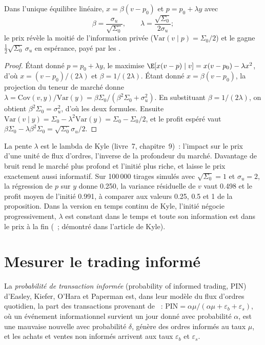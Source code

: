 \begin{proposition}\label{prop:mx:why-there-is-a-spread:kyle}
Dans l'unique équilibre linéaire, $x=\beta(v-p_0)$ et $p=p_0+\lambda y$ avec
\[
\beta=\frac{\sigma_u}{\sqrt{\Sigma_0}},\qquad \lambda=\frac{\sqrt{\Sigma_0}}{2\sigma_u};
\]
le prix révèle la moitié de l'information privée ($\mathrm{Var}(v\mid p)=\Sigma_0/2$) et le  gagne
$\tfrac12\sqrt{\Sigma_0}\,\sigma_u$ en espérance, payé par les .
\end{proposition}

\begin{proof}
Étant donné $p=p_0+\lambda y$, le  maximise $\E[x(v-p)\mid v]=x(v-p_0)-\lambda x^2$, d'où $x=(v-p_0)/(2\lambda)$ et $\beta=1/(2\lambda)$. Étant donné
$x=\beta(v-p_0)$, la projection du teneur de marché donne $\lambda=\mathrm{Cov}(v,y)/\mathrm{Var}(y)=\beta\Sigma_0/(\beta^2\Sigma_0+\sigma_u^2)$. En substituant
$\beta=1/(2\lambda)$, on obtient $\beta^2\Sigma_0=\sigma_u^2$, d'où les deux formules. Ensuite $\mathrm{Var}(v\mid y)=\Sigma_0-\lambda^2\mathrm{Var}(y)=\Sigma_0-\Sigma_0/2$,
et le profit espéré vaut $\beta\Sigma_0-\lambda\beta^2\Sigma_0=\sqrt{\Sigma_0}\sigma_u/2$.
\end{proof}

La pente $\lambda$ est le lambda de Kyle (livre~7, chapitre~9)~: l'impact sur le prix d'une unité de flux d'ordres, l'inverse de la profondeur du marché. Davantage de bruit
rend le marché plus profond et l'initié plus riche, et laisse le prix exactement aussi informatif. Sur 100\,000 tirages simulés avec $\sqrt{\Sigma_0}=1$ et
$\sigma_u=2$, la régression de $p$ sur $y$ donne 0.250, la variance résiduelle de $v$ vaut 0.498 et le profit moyen de l'initié 0.991, à comparer aux
valeurs 0.25, 0.5 et 1 de la proposition. Dans la version en temps continu de Kyle, l'initié négocie progressivement, $\lambda$ est constant dans le temps et toute son
information est dans le prix à la fin (\admitted~; démontré dans l'article de Kyle).

\section{Mesurer le trading informé}

\begin{definition}\label{def:mx:why-there-is-a-spread:pin}
La \emph{probabilité de transaction informée} (probability of informed trading, PIN) d'Easley, Kiefer, O'Hara et Paperman est, dans leur modèle
du flux d'ordres quotidien, la part des transactions provenant de ~: $\mathrm{PIN}=\alpha\mu/(\alpha\mu+\varepsilon_b+\varepsilon_s)$, où un événement
informationnel survient un jour donné avec probabilité $\alpha$, est une mauvaise nouvelle avec probabilité $\delta$, génère des ordres informés au taux $\mu$, et les achats et ventes non informés arrivent
aux taux $\varepsilon_b$ et $\varepsilon_s$.
\end{definition}


